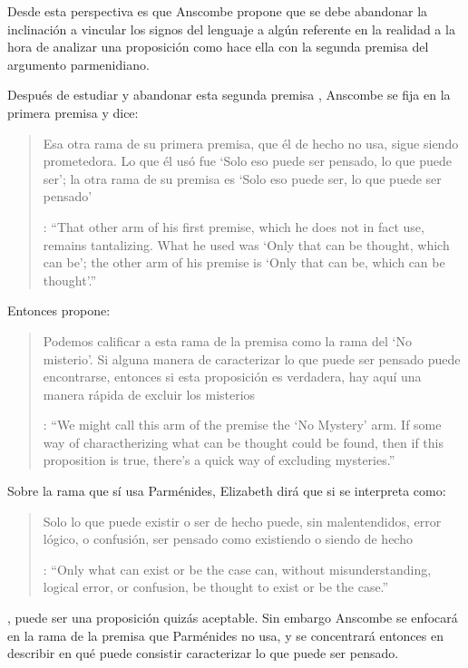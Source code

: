 Desde esta perspectiva es que Anscombe propone que se debe abandonar la inclinación a vincular los signos del lenguaje a algún referente en la realidad a la hora de analizar una proposición como hace ella con la segunda premisa del argumento parmenidiano.

Después de estudiar y abandonar esta segunda premisa , Anscombe se fija en la primera premisa y dice: \blockquote[{\cite[5]{anscombe1981parmenides:pmc}}: \enquote{That other arm of his first premise, which he does not in fact use, remains tantalizing. What he used was `Only that can be thought, which can be'; the other arm of his premise is `Only that can be, which can be thought'.}]{Esa otra rama de su primera premisa, que él de hecho no usa, sigue siendo prometedora. Lo que él usó fue `Solo eso puede ser pensado, lo que puede ser'; la otra rama de su premisa es `Solo eso puede ser, lo que puede ser pensado'}. Entonces propone: \blockquote[{\cite[5]{anscombe1981parmenides:pmc}}: \enquote{We might call this arm of the premise the `No Mystery' arm. If some way of charactherizing what can be thought could be found, then if this proposition is true, there's a quick way of excluding mysteries.}]{Podemos calificar a esta rama de la premisa como la rama del `No misterio'. Si alguna manera de caracterizar lo que puede ser pensado puede encontrarse, entonces si esta proposición es verdadera, hay aquí una manera rápida de excluir los misterios}. Sobre la rama que sí usa Parménides, Elizabeth dirá que si se interpreta como: \blockquote[{\cite[6]{anscombe1981parmenides:pmc}}: \enquote{Only what can exist or be the case can, without misunderstanding, logical error, or confusion, be thought to exist or be the case.}]{Solo lo que puede existir o ser de hecho puede, sin malentendidos, error lógico, o confusión, ser pensado como existiendo o siendo de hecho}, puede ser una proposición quizás aceptable. Sin embargo Anscombe se enfocará en la rama de la premisa que Parménides no usa, y se concentrará entonces en describir en qué puede consistir caracterizar lo que puede ser pensado.

